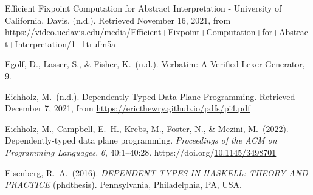 \documentclass[12pt,twoside]{article}
\begin{document}
{\begin{thebibliography}{1079}
\mdbibitemlabel{}Efficient Fixpoint Computation for Abstract Interpretation - University of California, Davis. (n.d.). Retrieved November 16, 2021, from \href{https://video.ucdavis.edu/media/Efficient+Fixpoint+Computation+for+Abstract+Interpretation/1_1trufm5a}{{\ttfamily https://\hspace{0pt}video.\hspace{0pt}ucdavis.\hspace{0pt}edu/\hspace{0pt}media/\hspace{0pt}Efficient+\hspace{0pt}Fixpoint+\hspace{0pt}Computation+\hspace{0pt}for+\hspace{0pt}Abstract+\hspace{0pt}Interpretation/\hspace{0pt}1\_\hspace{0pt}1trufm5a}}%

\mdbibitemlabel{}Egolf, D., Lasser, S., \& Fisher, K.~(n.d.). Verbatim: A Veriﬁed Lexer Generator, 9.%

\mdbibitemlabel{}Eichholz, M.~(n.d.). Dependently-Typed Data Plane Programming. Retrieved December 7, 2021, from \href{https://ericthewry.github.io/pdfs/pi4.pdf}{{\ttfamily https://\hspace{0pt}ericthewry.\hspace{0pt}github.\hspace{0pt}io/\hspace{0pt}pdfs/\hspace{0pt}pi4.\hspace{0pt}pdf}}%

\mdbibitemlabel{}Eichholz, M., Campbell, E.~H., Krebs, M., Foster, N., \& Mezini, M.~(2022). Dependently-typed data plane programming. \emph{Proceedings of the ACM on Programming Languages}, \emph{6}, 40:1–40:28. https://doi.org/\href{https://dx.doi.org/10.1145/3498701}{10.1145/3498701}%

\mdbibitemlabel{}Eisenberg, R.~A.~(2016). \emph{DEPENDENT TYPES IN HASKELL: THEORY AND PRACTICE} (phdthesis). Pennsylvania, Philadelphia, PA, USA.%


\end{thebibliography}}
\end{document}

